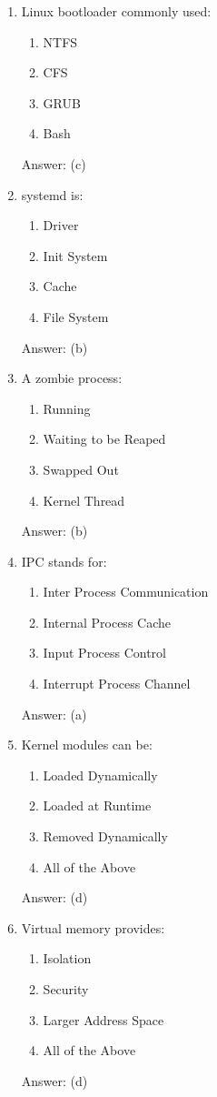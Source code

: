 \begin{enumerate}
\item Linux bootloader commonly used:
\begin{enumerate}[label=(\alph*)]
\item NTFS
\item CFS
\item GRUB
\item Bash
\end{enumerate}
Answer: (c)

\item systemd is:
\begin{enumerate}[label=(\alph*)]
\item Driver
\item Init System
\item Cache
\item File System
\end{enumerate}
Answer: (b)

\item A zombie process:
\begin{enumerate}[label=(\alph*)]
\item Running
\item Waiting to be Reaped
\item Swapped Out
\item Kernel Thread
\end{enumerate}
Answer: (b)

\item IPC stands for:
\begin{enumerate}[label=(\alph*)]
\item Inter Process Communication
\item Internal Process Cache
\item Input Process Control
\item Interrupt Process Channel
\end{enumerate}
Answer: (a)

\item Kernel modules can be:
\begin{enumerate}[label=(\alph*)]
\item Loaded Dynamically
\item Loaded at Runtime
\item Removed Dynamically
\item All of the Above
\end{enumerate}
Answer: (d)

\item Virtual memory provides:
\begin{enumerate}[label=(\alph*)]
\item Isolation
\item Security
\item Larger Address Space
\item All of the Above
\end{enumerate}
Answer: (d)


\end{enumerate}
